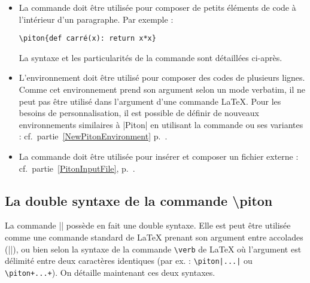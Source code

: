 \documentclass[dvipsnames,svgnames]{article}
\begin{document}
\begin{itemize} 
\item La commande  doit être utilisée
pour composer de petits éléments de code à l'intérieur d'un paragraphe. Par exemple :

{\color{gray}\verb|\piton{def carré(x): return x*x}|}\qquad 
{}

La syntaxe et les particularités de la commande sont détaillées ci-après.


\item L'environnement  doit être utilisé pour composer des
codes de plusieurs lignes. Comme cet environnement prend son argument selon un
mode verbatim, il ne peut pas être utilisé dans l'argument d'une commande LaTeX.
Pour les besoins de personnalisation, il est possible de définir de nouveaux
environnements similaires à |{Piton}| en utilisant la commande
 ou ses variantes :
cf.~partie~\ref{NewPitonEnvironment} p.~\pageref{NewPitonEnvironment}.

\item La commande  doit être utilisée pour insérer et
composer un fichier externe : cf.~partie~\ref{PitonInputFile},
p.~\pageref{PitonInputFile}.
\end{itemize}


\subsection{La double syntaxe de la commande \textbackslash piton}


La commande |\piton| possède en fait une double syntaxe. Elle est peut être utilisée comme
une commande standard de LaTeX prenant son argument entre accolades (||), ou
bien selon la syntaxe de la commande
\texttt{\textbackslash verb} de LaTeX où l'argument est délimité entre deux caractères 
identiques (par ex. : \verb!\piton|...|! ou \verb!\piton+...+!).
On détaille maintenant ces deux syntaxes.
\end{document}
